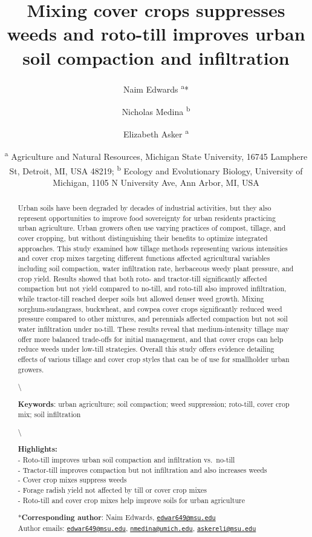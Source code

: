 \documentclass[
  12pt,
]{article}
\title{Mixing cover crops suppresses weeds and roto-till improves urban soil compaction and infiltration}
\author{Naim Edwards \textsuperscript{a}* \and Nicholas Medina \textsuperscript{b} \and Elizabeth Asker \textsuperscript{a}}
\date{\scriptsize \textsuperscript{a} Agriculture and Natural Resources, Michigan State University, 16745 Lamphere St, Detroit, MI, USA 48219; \textsuperscript{b} Ecology and Evolutionary Biology, University of Michigan, 1105 N University Ave, Ann Arbor, MI, USA}
\begin{document}
\maketitle
\begin{abstract}
Urban soils have been degraded by decades of industrial activities, but they also represent opportunities to improve food sovereignty for urban residents practicing urban agriculture.
Urban growers often use varying practices of compost, tillage, and cover cropping, but without distinguishing their benefits to optimize integrated approaches.
This study examined how tillage methods representing various intensities and cover crop mixes targeting different functions affected agricultural variables including soil compaction, water infiltration rate, herbaceous weedy plant pressure, and crop yield.
Results showed that both roto- and tractor-till significantly affected compaction but not yield compared to no-till, and roto-till also improved infiltration, while tractor-till reached deeper soils but allowed denser weed growth.
Mixing sorghum-sudangrass, buckwheat, and cowpea cover crops significantly reduced weed pressure compared to other mixtures, and perennials affected compaction but not soil water infiltration under no-till.
These results reveal that medium-intensity tillage may offer more balanced trade-offs for initial management, and that cover crops can help reduce weeds under low-till strategies.
Overall this study offers evidence detailing effects of various tillage and cover crop styles that can be of use for smallholder urban growers.

\textbackslash{}

\textbf{Keywords}: urban agriculture; soil compaction; weed suppression; roto-till, cover crop mix; soil infiltration

\textbackslash{}

\textbf{Highlights:}\\
- Roto-till improves urban soil compaction and infiltration vs.~no-till\\
- Tractor-till improves compaction but not infiltration and also increases weeds\\
- Cover crop mixes suppress weeds\\
- Forage radish yield not affected by till or cover crop mixes\\
- Roto-till and cover crop mixes help improve soils for urban agriculture

*\textbf{Corresponding author}: Naim Edwards, \href{mailto:edwar649@msu.edu}{\nolinkurl{edwar649@msu.edu}}\\
Author emails: \href{mailto:edwar649@msu.edu}{\nolinkurl{edwar649@msu.edu}}, \href{mailto:nmedina@umich.edu}{\nolinkurl{nmedina@umich.edu}}, \href{mailto:askereli@msu.edu}{\nolinkurl{askereli@msu.edu}}
\end{abstract}
\end{document}
